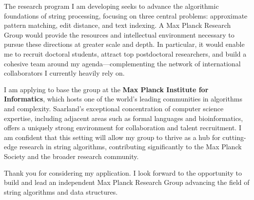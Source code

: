 \documentclass[11pt,a4paper,sans]{moderncv}
\begin{document}
The research program I am developing seeks to advance the algorithmic foundations of string processing, focusing on three central problems: approximate pattern matching, edit distance, and text indexing. A Max Planck Research Group would provide the resources and intellectual environment necessary to pursue these directions at greater scale and depth. In particular, it would enable me to recruit doctoral students, attract top postdoctoral researchers, and build a cohesive team around my agenda—complementing the network of international collaborators I currently heavily rely on.

I am applying to base the group at the \textbf{Max Planck Institute for Informatics}, which hosts one of the world’s leading communities in algorithms and complexity. Saarland’s exceptional concentration of computer science expertise, including adjacent areas such as formal languages and bioinformatics, offers a uniquely strong environment for collaboration and talent recruitment. I am confident that this setting will allow my group to thrive as a hub for cutting-edge research in string algorithms, contributing significantly to the Max Planck Society and the broader research community.

Thank you for considering my application. I look forward to the opportunity to build and lead an independent Max Planck Research Group advancing the field of string algorithms and data structures.

\makeletterclosing

\end{document}
